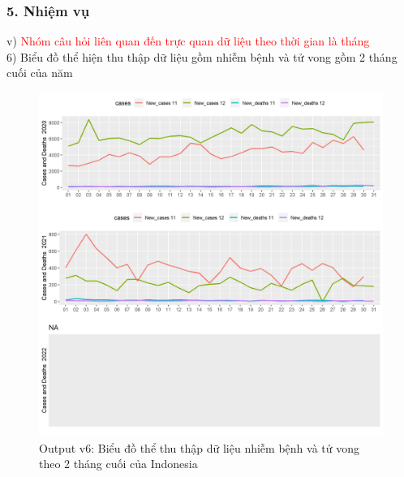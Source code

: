 \documentclass[english,10pt,table]{beamer}
\begin{document}
\begin{frame}[fragile]
\frametitle{5.  Nhiệm vụ}
v) \textcolor{red}{Nhóm câu hỏi liên quan đến trực quan dữ liệu theo thời gian là tháng}\\
    6) Biểu đồ thể hiện thu thập dữ liệu gồm nhiễm bệnh và tử vong gồm 2 tháng cuối của năm
	\begin{figure}[h!]
	\begin{center}
		    \includegraphics[scale = 0.25]{Images/V/v6 Indonesia .jpeg}
		     \caption{Output v6: Biểu đồ thể thu thập dữ liệu nhiễm bệnh và tử vong theo 2 tháng cuối của Indonesia}
		\end{center}
		\end{figure}
\end{frame}
\end{document}
